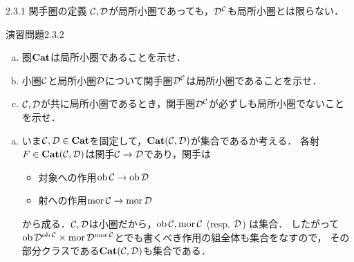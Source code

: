 \documentclass[uplatex,a4paper,dvipdfmx,aspectratio=169,10pt]{beamer}
\begin{document}
\begin{frame}[fragile]{2.3.1 関手圏の定義}
    $\mathcal{C}, \mathcal{D}$が局所小圏であっても，$\mathcal{D}^{\mathcal{C}}$も局所小圏とは限らない．
    \begin{exampleblock}{演習問題2.3.2}
        \begin{enumerate}[(a)]
            \item 圏$\mathbf{Cat}$は局所小圏であることを示せ．
            \item 小圏$\mathcal{C}$と局所小圏$\mathcal{D}$について関手圏$\mathcal{D}^{\mathcal{C}}$は局所小圏であることを示せ．
            \item $\mathcal{C}, \mathcal{D}$が共に局所小圏であるとき，関手圏$\mathcal{D}^{\mathcal{C}}$が必ずしも局所小圏でないことを示せ．
        \end{enumerate}
    \end{exampleblock}
    \begin{enumerate}[(a)]
        \item いま$\mathcal{C}, \mathcal{D} \in \mathbf{Cat}$を固定して，$\mathbf{Cat}(\mathcal{C}, \mathcal{D})$が集合であるか考える．
            各射$F \in \mathbf{Cat}(\mathcal{C}, \mathcal{D})$は関手$\mathcal{C} \to \mathcal{D}$であり，関手は
            \begin{itemize}
                \item 対象への作用$\operatorname{{\mathrm{ob}}} \mathcal{C} \to \operatorname{{\mathrm{ob}}} \mathcal{D}$
                \item 射への作用$\operatorname{{\mathrm{mor}}} \mathcal{C} \to \operatorname{{\mathrm{mor}}} \mathcal{D}$
            \end{itemize}
            から成る．$\mathcal{C}, \mathcal{D}$は小圏だから，$\operatorname{{\mathrm{ob}}} \mathcal{C}, \operatorname{{\mathrm{mor}}} \mathcal{C}$ (resp. $\mathcal{D}$) は集合．
            したがって$\operatorname{{\mathrm{ob}}} \mathcal{D}^{\operatorname{{\mathrm{ob}}} \mathcal{C}} \times \operatorname{{\mathrm{mor}}} \mathcal{D}^{\operatorname{{\mathrm{mor}}} \mathcal{C}}$とでも書くべき作用の組全体も集合をなすので，
            その部分クラスである$\mathbf{Cat}(\mathcal{C}, \mathcal{D})$も集合である．
    \end{enumerate}
\end{frame}
\end{document}
